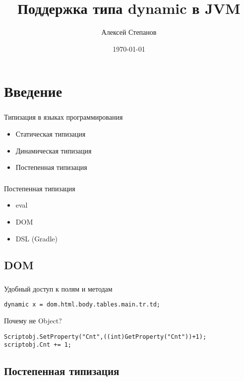 \documentclass[t]{beamer}  %
\title{Поддержка типа dynamic в JVM}
\author{Алексей Степанов}
\date{\today}
\institute[СПб АУ НОЦНТ РАН]{САНКТ-ПЕТЕРБУРГСКИЙ АКАДЕМИЧЕСКИЙ УНИВЕРСИТЕТ}
\begin{document}
\frame[plain]{\titlepage}	%

\section{Введение}
 
\begin{frame}
	\frametitle{\insertsection} 
    Типизация в языках программирования
	\begin{itemize}
    	\item Статическая типизация
       	\item Динамическая типизация
        \item Постепенная типизация
	\end{itemize}    
\end{frame}

\begin{frame}
	\frametitle{\insertsection} 
	Постепенная типизация
	\begin{itemize}
    	\item eval
       	\item DOM
        \item DSL (Gradle)
	\end{itemize}    
\end{frame}

\subsection{DOM}

\begin{frame}[fragile]
	\frametitle{\insertsection} 
    \framesubtitle{\insertsubsection}
	\begin{block}{Удобный доступ к полям и методам}
	\begin{verbatim}
dynamic x = dom.html.body.tables.main.tr.td;
	\end{verbatim}
    \end{block}
    
    \begin{block}{Почему не Object?}
    \begin{verbatim}
Scriptobj.SetProperty("Cnt",((int)GetProperty("Cnt"))+1);
scriptobj.Cnt += 1;
	\end{verbatim}
    \end{block}
\end{frame}


\subsection{Постепенная типизация}
\end{document}
